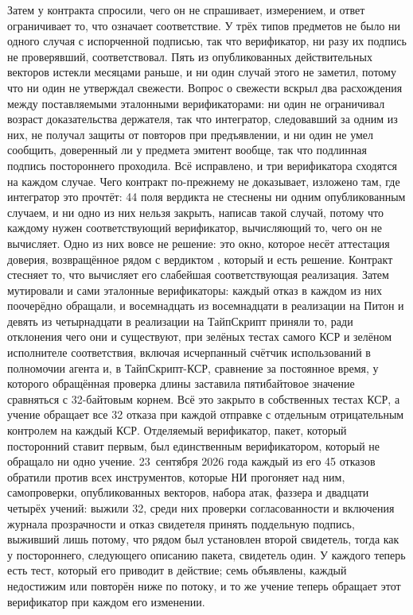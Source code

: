 Затем у контракта спросили, чего он не спрашивает, измерением, и ответ ограничивает то, что
означает соответствие. У трёх типов предметов не было ни одного случая с испорченной подписью, так
что верификатор, ни разу их подпись не проверявший, соответствовал. Пять из опубликованных
действительных векторов истекли месяцами раньше, и ни один случай этого не заметил, потому что ни
один не утверждал свежести. Вопрос о свежести вскрыл два расхождения между поставляемыми
эталонными верификаторами: ни один не ограничивал возраст доказательства держателя, так что
интегратор, следовавший за одним из них, не получал защиты от повторов при предъявлении, и ни один
не умел сообщить, доверенный ли у предмета эмитент вообще, так что подлинная подпись постороннего
проходила. Всё исправлено, и три верификатора сходятся на каждом случае. Чего контракт по-прежнему
не доказывает, изложено там, где интегратор это прочтёт: 44 поля вердикта не стеснены ни одним
опубликованным случаем, и ни одно из них нельзя закрыть, написав такой случай, потому что каждому
нужен соответствующий верификатор, вычисляющий то, чего он не вычисляет. Одно из них вовсе не
решение: это окно, которое несёт аттестация доверия, возвращённое рядом с вердиктом
, который и есть решение. Контракт стесняет то, что
вычисляет его слабейшая соответствующая реализация. Затем мутировали и сами эталонные
верификаторы: каждый отказ в каждом из них поочерёдно обращали, и восемнадцать из восемнадцати в
реализации на Питон и девять из четырнадцати в реализации на ТайпСкрипт приняли то, ради отклонения
чего они и существуют, при зелёных тестах самого КСР и зелёном исполнителе соответствия, включая
исчерпанный счётчик использований в полномочии агента и, в ТайпСкрипт-КСР, сравнение за постоянное
время, у которого обращённая проверка длины заставила пятибайтовое значение сравняться с
32-байтовым корнем. Всё это закрыто в собственных тестах КСР, а учение обращает все 32 отказа при
каждой отправке с отдельным отрицательным контролем на каждый КСР. Отделяемый верификатор, пакет,
который посторонний ставит первым, был единственным верификатором, который не обращало ни одно
учение. 23~сентября 2026 года каждый из его 45 отказов обратили против всех инструментов, которые
НИ прогоняет над ним, самопроверки, опубликованных векторов, набора атак, фаззера и двадцати
четырёх учений: выжили 32, среди них проверки согласованности и включения журнала прозрачности и
отказ свидетеля  принять поддельную подпись, выживший лишь потому, что рядом был
установлен второй свидетель, тогда как у постороннего, следующего описанию пакета, свидетель один.
У каждого теперь есть тест, который его приводит в действие; семь объявлены, каждый недостижим или
повторён ниже по потоку, и то же учение теперь обращает этот верификатор при каждом его изменении.
\sImpl

